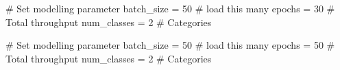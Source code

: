 \documentclass[
  letterpaper,
  DIV=11,
  numbers=noendperiod]{scrartcl}
\newenvironment{Shaded}{\begin{snugshade}}{\end{snugshade}}
\newcommand{\CommentTok}[1]{\textcolor[rgb]{0.37,0.37,0.37}{#1}}
\newcommand{\DecValTok}[1]{\textcolor[rgb]{0.68,0.00,0.00}{#1}}
\newcommand{\NormalTok}[1]{\textcolor[rgb]{0.00,0.23,0.31}{#1}}
\newcommand{\OperatorTok}[1]{\textcolor[rgb]{0.37,0.37,0.37}{#1}}
\begin{document}
\begin{Shaded}
\begin{Highlighting}[]
\CommentTok{\# Set modelling parameter }
\NormalTok{batch\_size }\OperatorTok{=} \DecValTok{50} \CommentTok{\# load this many}
\NormalTok{epochs }\OperatorTok{=} \DecValTok{30}     \CommentTok{\# Total throughput }
\NormalTok{num\_classes }\OperatorTok{=} \DecValTok{2} \CommentTok{\# Categories}
\end{Highlighting}
\end{Shaded}

\begin{Shaded}
\begin{Highlighting}[]
\CommentTok{\# Set modelling parameter }
\NormalTok{batch\_size }\OperatorTok{=} \DecValTok{50} \CommentTok{\# load this many}
\NormalTok{epochs }\OperatorTok{=} \DecValTok{50}     \CommentTok{\# Total throughput }
\NormalTok{num\_classes }\OperatorTok{=} \DecValTok{2} \CommentTok{\# Categories}


\end{Highlighting}
\end{Shaded}
\end{document}
